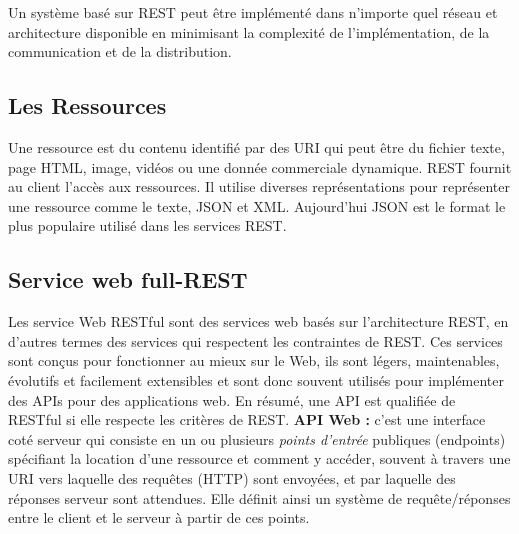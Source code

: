 				Un système basé sur REST peut être implémenté dans n'importe quel réseau et architecture disponible en minimisant la complexité de l'implémentation, de la communication et de la distribution.
			\subsection{Les Ressources}
			Une ressource est du contenu identifié par des URI  qui peut être du fichier texte, page HTML, image, vidéos ou une donnée commerciale dynamique.
REST fournit au client l'accès aux ressources. Il utilise diverses représentations pour représenter une ressource comme le texte, JSON et XML. Aujourd'hui JSON est le format le plus populaire utilisé dans les services REST.

			\subsection{Service web full-REST}
		Les service Web RESTful sont des services web basés sur l'architecture REST, en d'autres termes des services qui respectent les contraintes de REST.
Ces services sont conçus pour fonctionner au mieux sur le Web, ils sont légers, maintenables, évolutifs et facilement extensibles et sont donc souvent utilisés pour implémenter des APIs pour des applications web.\cite{refTutorialPointsREST}
\newline 
En résumé, une API est qualifiée de RESTful si elle respecte les critères de REST.
\newline
\newline
\textbf{API Web :} c'est une interface coté serveur qui consiste en un ou plusieurs \emph{points d'entrée} publiques (endpoints) spécifiant la location d'une ressource et comment y accéder, souvent à travers une URI vers laquelle des requêtes (HTTP) sont envoyées, et par laquelle des réponses serveur sont attendues.
Elle définit ainsi un système de requête/réponses entre le client et le serveur à partir de ces points.

\newpage
